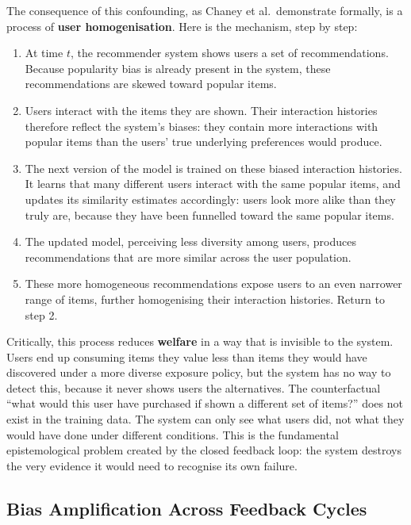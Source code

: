 \documentclass[11pt,a4paper]{report}
\begin{document}
The consequence of this confounding, as Chaney et al.\ demonstrate formally, is a process of \textbf{user homogenisation}. Here is the mechanism, step by step:

\begin{enumerate}
    \item At time $t$, the recommender system shows users a set of recommendations. Because popularity bias is already present in the system, these recommendations are skewed toward popular items.
    \item Users interact with the items they are shown. Their interaction histories therefore reflect the system's biases: they contain more interactions with popular items than the users' true underlying preferences would produce.
    \item The next version of the model is trained on these biased interaction histories. It learns that many different users interact with the same popular items, and updates its similarity estimates accordingly: users look more alike than they truly are, because they have been funnelled toward the same popular items.
    \item The updated model, perceiving less diversity among users, produces recommendations that are more similar across the user population.
    \item These more homogeneous recommendations expose users to an even narrower range of items, further homogenising their interaction histories. Return to step 2.
\end{enumerate}

Critically, this process reduces \textbf{welfare} in a way that is invisible to the system. Users end up consuming items they value less than items they would have discovered under a more diverse exposure policy, but the system has no way to detect this, because it never shows users the alternatives. The counterfactual ``what would this user have purchased if shown a different set of items?'' does not exist in the training data. The system can only see what users did, not what they would have done under different conditions. This is the fundamental epistemological problem created by the closed feedback loop: the system destroys the very evidence it would need to recognise its own failure.

\subsection*{Bias Amplification Across Feedback Cycles}
\end{document}
